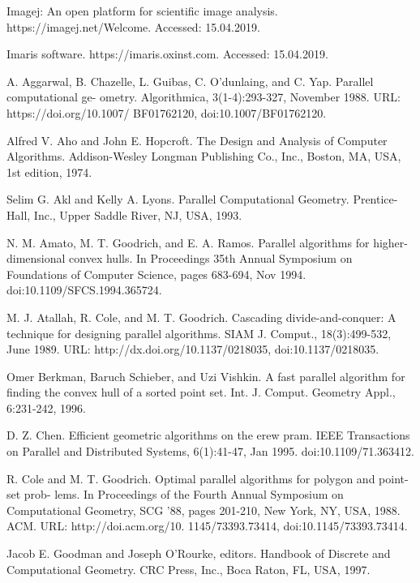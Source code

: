 \documentclass[twoside,twocolumn,10pt]{article}
\begin{document}
\begin{thebibliography}{99}
\label{references}

 Imagej: An open platform for scientific image analysis. https://imagej.net/Welcome.
Accessed: 15.04.2019.

 Imaris software. https://imaris.oxinst.com. Accessed: 15.04.2019. 

 A. Aggarwal, B. Chazelle, L. Guibas, C. O'dunlaing, and C. Yap. Parallel computational ge-
ometry. Algorithmica, 3(1-4):293-327, November 1988. URL: https://doi.org/10.1007/
BF01762120, doi:10.1007/BF01762120.

 Alfred V. Aho and John E. Hopcroft. The Design and Analysis of Computer Algorithms.
Addison-Wesley Longman Publishing Co., Inc., Boston, MA, USA, 1st edition, 1974.

 Selim G. Akl and Kelly A. Lyons. Parallel Computational Geometry. Prentice-Hall, Inc.,
Upper Saddle River, NJ, USA, 1993.

 N. M. Amato, M. T. Goodrich, and E. A. Ramos. Parallel algorithms for higher-dimensional
convex hulls. In Proceedings 35th Annual Symposium on Foundations of Computer Science,
pages 683-694, Nov 1994. doi:10.1109/SFCS.1994.365724.

 M. J. Atallah, R. Cole, and M. T. Goodrich. Cascading divide-and-conquer: A technique
for designing parallel algorithms. SIAM J. Comput., 18(3):499-532, June 1989. URL:
http://dx.doi.org/10.1137/0218035, doi:10.1137/0218035.

 Omer Berkman, Baruch Schieber, and Uzi Vishkin. A fast parallel algorithm for finding
the convex hull of a sorted point set. Int. J. Comput. Geometry Appl., 6:231-242, 1996.

 D. Z. Chen. Efficient geometric algorithms on the erew pram. IEEE Transactions on
Parallel and Distributed Systems, 6(1):41-47, Jan 1995. doi:10.1109/71.363412.

 R. Cole and M. T. Goodrich. Optimal parallel algorithms for polygon and point-set prob-
lems. In Proceedings of the Fourth Annual Symposium on Computational Geometry, SCG
'88, pages 201-210, New York, NY, USA, 1988. ACM. URL: http://doi.acm.org/10.
1145/73393.73414, doi:10.1145/73393.73414.

 Jacob E. Goodman and Joseph O'Rourke, editors. Handbook of Discrete and Computational
Geometry. CRC Press, Inc., Boca Raton, FL, USA, 1997.


\end{thebibliography}
\end{document}
